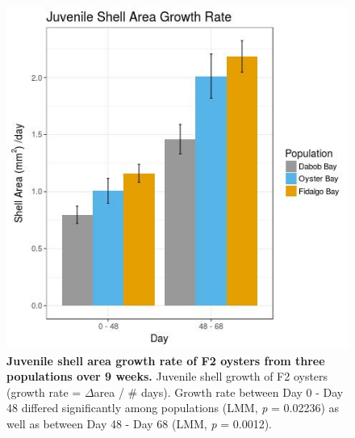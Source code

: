 \documentclass[10pt,letterpaper]{article}
\begin{document}
\begin{figure}[!h]
\includegraphics[width=0.7\linewidth]{Juvenile_Growth_Bar_PS215_color}
\caption{{\bf Juvenile shell area growth rate of F2 oysters from three populations over 9 weeks.}
Juvenile shell growth of F2 oysters (growth rate = $\Delta$area / \# days). Growth rate between Day 0 - Day 48 differed significantly among populations (LMM, \textit{p} = 0.02236) as well as between Day 48 - Day 68 (LMM, \textit{p} = 0.0012).}
\label{fig4}
\end{figure}
\end{document}
